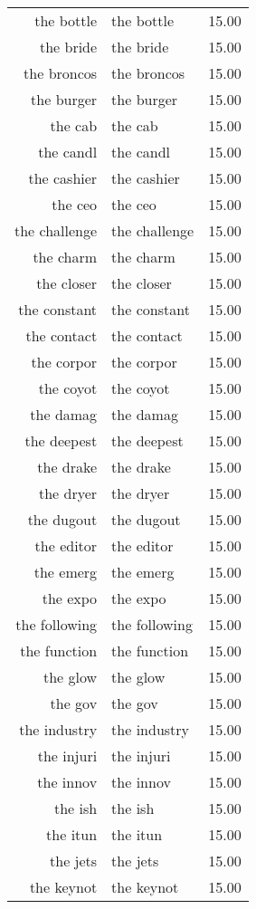 \begin{table}[ht]
\begin{tabular}{rlr}
  the bottle & the bottle & 15.00 \\ 
  the bride & the bride & 15.00 \\ 
  the broncos & the broncos & 15.00 \\ 
  the burger & the burger & 15.00 \\ 
  the cab & the cab & 15.00 \\ 
  the candl & the candl & 15.00 \\ 
  the cashier & the cashier & 15.00 \\ 
  the ceo & the ceo & 15.00 \\ 
  the challenge & the challenge & 15.00 \\ 
  the charm & the charm & 15.00 \\ 
  the closer & the closer & 15.00 \\ 
  the constant & the constant & 15.00 \\ 
  the contact & the contact & 15.00 \\ 
  the corpor & the corpor & 15.00 \\ 
  the coyot & the coyot & 15.00 \\ 
  the damag & the damag & 15.00 \\ 
  the deepest & the deepest & 15.00 \\ 
  the drake & the drake & 15.00 \\ 
  the dryer & the dryer & 15.00 \\ 
  the dugout & the dugout & 15.00 \\ 
  the editor & the editor & 15.00 \\ 
  the emerg & the emerg & 15.00 \\ 
  the expo & the expo & 15.00 \\ 
  the following & the following & 15.00 \\ 
  the function & the function & 15.00 \\ 
  the glow & the glow & 15.00 \\ 
  the gov & the gov & 15.00 \\ 
  the industry & the industry & 15.00 \\ 
  the injuri & the injuri & 15.00 \\ 
  the innov & the innov & 15.00 \\ 
  the ish & the ish & 15.00 \\ 
  the itun & the itun & 15.00 \\ 
  the jets & the jets & 15.00 \\ 
  the keynot & the keynot & 15.00 \\ 

\end{tabular}
\end{table}
